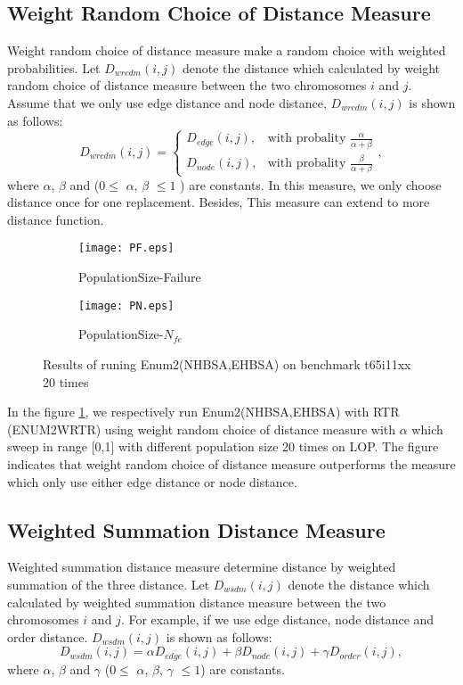 \subsection{Weight Random Choice of Distance Measure}
Weight random choice of distance measure make a random choice with weighted probabilities. Let $D_{wrcdm} (i,j)$ denote the distance which calculated by weight random choice of distance measure between the two chromosomes $i$ and $j$. Assume that we only use edge distance and node distance, $D_{wrcdm} (i,j)$ is shown as follows:\[D_{wrcdm} (i,j)=
\begin{cases}
D_{edge} (i,j),  & \mbox{with probality } \frac{\alpha}{\alpha+\beta} \\
D_{node} (i,j), & \mbox{with probality } \frac{\beta}{\alpha+\beta} 
\end{cases}
,\]
where $\alpha$, $\beta$ and  ($0\leq$ $\alpha$, $\beta$ $\leq 1$ ) are constants. In this measure, we only choose distance once for one replacement. Besides, This measure can extend to more distance function.


\begin{figure}[htbp] 
        \centering
        \begin{subfigure}{0.45\textwidth}
            \texttt{[image: PF.eps]}
            \caption{PopulationSize-Failure} 
        \end{subfigure}
        \begin{subfigure}{0.45\textwidth} 
            \texttt{[image: PN.eps]}
            \caption{PopulationSize-$N_{fe}$}
        \end{subfigure}

        \caption{Results of runing Enum2(NHBSA,EHBSA) on benchmark t65i11xx 20 times} 
        \label{fig:enum2_sp}
\end{figure}

In the figure \ref{fig:enum2_sp}, we respectively run Enum2(NHBSA,EHBSA) with RTR (ENUM2WRTR) using weight random choice of distance measure with $\alpha$ which sweep in range [0,1] with different population size 20 times on LOP.  The figure indicates that weight random choice of distance measure outperforms  the measure which only use either edge distance or node distance.

 
\subsection{Weighted Summation Distance Measure}
Weighted summation distance measure determine distance by weighted summation of the three distance. Let $D_{wsdm} (i,j)$ denote the distance which calculated by weighted summation distance measure between the two chromosomes $i$ and $j$. For example, if we use edge distance, node distance and order distance. $D_{wsdm} (i,j)$ is shown as follows:\[D_{wsdm} (i,j)=\alpha D_{edge} (i,j)+\beta D_{node} (i,j)+\gamma D_{order} (i,j),\]
where $\alpha$, $\beta$ and $\gamma$ ($0\leq$ $\alpha$, $\beta$, $\gamma$ $\leq 1$) are constants.

